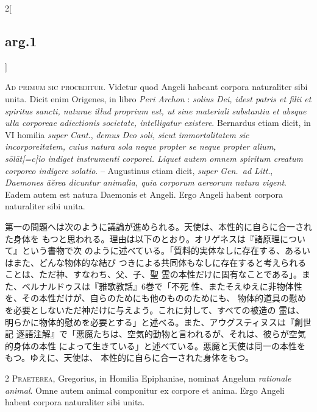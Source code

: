 \documentclass[paper=a4paper,fontsize=10pt,jafontsize=9pt,titlepage]{jlreq}
\begin{document}
\begin{paracol}{2}[\subsection{arg.1}]

{\huge A}{\scshape d primum sic proceditur}. Videtur quod Angeli habeant corpora
naturaliter sibi unita. Dicit enim Origenes, in libro {\itshape Peri Archon} :
{\itshape solius Dei, idest patris et filii et spiritus sancti, naturae illud
proprium est, ut sine materiali substantia et absque ulla corporeae adiectionis
societate, intelligatur existere}. Bernardus etiam dicit, in VI homilia
{\itshape super Cant}., {\itshape demus Deo soli, sicut immortalitatem sic
incorporeitatem, cuius natura sola neque propter se neque propter alium,
s\={o}l\={a}t[=c]io indiget instrumenti corporei. Liquet autem omnem spiritum
creatum corporeo indigere solatio}. -- Augustinus etiam dicit, {\itshape super
Gen.~ad Litt}., {\itshape Daemones \={a}\u{e}rea dicuntur animalia, quia
corporum aereorum natura vigent}. Eadem autem est natura Daemonis et
Angeli. Ergo Angeli habent corpora naturaliter sibi unita.

\switchcolumn

第一の問題へは次のように議論が進められる。天使は、本性的に自らに合一された身体を
もつと思われる。理由は以下のとおり。オリゲネスは『諸原理について』という書物で次
のように述べている。「質料的実体なしに存在する、あるいはまた、どんな物体的な結び
つきによる共同体もなしに存在すると考えられることは、ただ神、すなわち、父、子、聖
霊の本性だけに固有なことである」。また、ベルナルドゥスは『雅歌教話』6巻で「不死
性、またそえゆえに非物体性を、その本性だけが、自らのためにも他のもののためにも、
物体的道具の慰めを必要としないただ神だけに与えよう。これに対して、すべての被造の
霊は、明らかに物体的慰めを必要とする」と述べる。また、アウグスティヌスは『創世記
逐語注解』で「悪魔たちは、空気的動物と言われるが、それは、彼らが空気的身体の本性
によって生きている」と述べている。悪魔と天使は同一の本性をもつ。ゆえに、天使は、
本性的に自らに合一された身体をもつ。


{\scshape 2 Praeterea}, Gregorius, in Homilia Epiphaniae, nominat Angelum
{\itshape rationale animal}. Omne autem animal componitur ex corpore et
anima. Ergo Angeli habent corpora naturaliter sibi unita.


\end{paracol}
\end{document}
